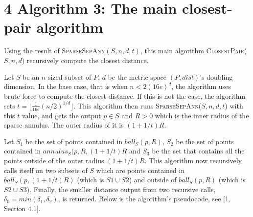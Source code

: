 \documentclass[12pt,english,]{article}
\begin{document}
\hypertarget{section4}{%
\section{\texorpdfstring{4 \enspace Algorithm 3: The main closest-pair
algorithm}{4 Algorithm 3: The main closest-pair algorithm}}\label{section4}}

Using the result of \textsc{SparseSepAnn$(S,n,d,t)$}, this main
algorithm \textsc{ClosestPair($S,n,d$)} recursively compute the closest
distance.

Let \(S\) be an \(n\)-sized subset of \(P\), \(d\) be the metric space
\((P, dist)\)'s doubling dimension. In the base case, that is when
\(n < 2(16e)^d\), the algorithm uses brute-force to compute the closest
distance. If this is not the case, the algorithm sets
\(t = \lfloor \frac{1}{16e}(n/2)^{1/d}\rfloor\). This algorithm then
runs \textsc{SparseSepAnn($S,n,d,t$)} with this \(t\) value, and gets
the output \(p \in S\) and \(R>0\) which is the inner radius of the
sparse annulus. The outer radius of it is \((1+1/t)R\).

Let \(S_1\) be the set of points contained in \(ball_S(p, R)\), \(S_2\)
be the set of points contained in \(annulus_S(p, R, (1+1/t)R\) and
\(S_3\) be the set that contains all the points outside of the outer
radius \((1+1/t)R\). This algorithm now recursively calls itself on two
subsets of \(S\) which are points contained in \(ball_S(p,(1+1/t)R)\)
(which is \(S1 \cup S2\)) and outside of \(ball_S(p, R)\) (which is
\(S2 \cup S3\)). Finally, the smaller distance output from two recursive
calls, \(\delta_0 = min(\delta_1, \delta_2)\), is returned. Below is the
algorithm's pseudocode, see {[}1, Section 4.1{]}.
\end{document}
